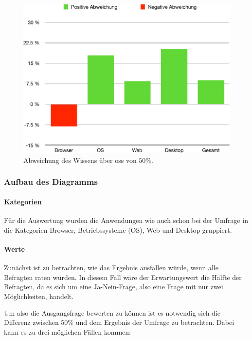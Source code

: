 \documentclass[a4paper]{article}
\begin{document}
                        
            \begin{figure}
                \includegraphics[width=\textwidth]{assets/results/openSourceJudging/openSourceJudgingDetailedOSSOnly2.pdf}
                \caption{Abweichung des Wissens über \gls{oss} von $50 \%$.}
                \label{figure:knowledge_difference}
            \end{figure}
            
            
            \subsubsection{Aufbau des Diagramms}
                \paragraph{Kategorien}
                    Für die Auswertung wurden die Anwendungen wie auch schon bei der Umfrage in die Kategorien Browser, Betriebssysteme (OS), Web und Desktop gruppiert.
                    
                \paragraph{Werte}
                    Zunächst ist zu betrachten, wie das Ergebnis ausfallen würde, wenn alle Befragten raten würden. In diesem Fall wäre der Erwartungswert die Hälfte der Befragten, da es sich um eine Ja-Nein-Frage, also eine Frage mit nur zwei Möglichkeiten, handelt.
                    
                    Um also die Ausgangsfrage bewerten zu können ist es notwendig sich die Differenz zwischen $50 \%$ und dem Ergebnis der Umfrage zu betrachten. Dabei kann es zu drei möglichen Fällen kommen:\\
            
\end{document}
